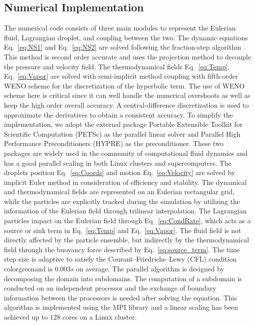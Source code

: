 \documentclass[draft,linenumbers]{agujournal}
\newcommand{\Eq}[1]{Eq.~\eqref{#1}}
\begin{document}
\subsection{Numerical Implementation}
The numerical code consists of three main modules to represent the Eulerian fluid, Lagrangian droplet, and coupling between the two. The dynamic equations \Eq{eq:NS1} and \Eq{eq:NS2} are solved following the fraction-step algorithm \citep{Brown2001}. {\color{green}This method is second order accurate and uses the projection method to decouple the pressure and velocity field.} The thermodynamical fields \Eq{eq:Temp}, \Eq{eq:Vapor} are solved with semi-implicit method coupling with fifth-order WENO scheme for the discretization of the hyperbolic term. The use of WENO scheme here is critical since it can well handle the numerical overshoots as well as keep the high order overall accuracy. {\color{green}A central-difference discretization is used to approximate the derivatives to obtain a consistent accuracy.} To simplify the implementation, we adopt the external package Portable Extensible Toolkit for Scientific Computation (PETSc) \citep{petsc_cite} as the parallel linear solver and Parallel High Performance Preconditioners (HYPRE) \citep{hypre_cite} as the preconditioner. These two packages are widely used in the community of computational fluid dynamics and has a good parallel scaling in both Linux clusters and supercomputers. The droplets position \Eq{eq:Coords} and motion \Eq{eq:Velocity} are solved by implicit Euler method in consideration of efficiency and stability. The dynamical and thermodynamical fields are represented on an Eulerian rectangular grid, while the particles are explicitly tracked during the simulation by utilizing the information of the Eulerian field through {\color{green}trilinear} interpolation. The Lagrangian particles impact on the Eulerian field through \Eq{eq:CondRate}, which acts as a source or sink term in \Eq{eq:Temp} and \Eq{eq:Vapor}. The fluid field is not directly affected by the particle ensemble, but indirectly by the thermodynamical field through the buoyancy force described by \Eq{eq:source_term}. The time step size is adaptive to satisfy the Courant--Friedrichs--Lewy (CFL) condition {color{green}and is $0.003s$ on average}. {\color{green}The parallel algorithm is designed by decomposing the domain into subdomains. The computation of a subdomain is conducted on an independent processor and the exchange of boundary information between the processors is needed after solving the equation. This algorithm is implemented using the MPI library and a linear scaling has been achieved up to $128$ cores on a Linux cluster.}
\end{document}
